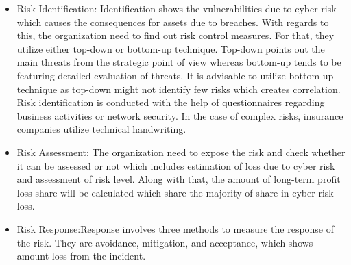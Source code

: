 \documentclass[conference]{IEEEtran}
\begin{document}
\begin{itemize}
    \item Risk Identification: Identification shows the vulnerabilities due to cyber risk which causes the consequences for assets due to breaches. With regards to this, the organization need to find out risk control measures. For that, they utilize either top-down or bottom-up technique. Top-down points out the main threats from the strategic point of view whereas bottom-up tends to be featuring detailed evaluation of threats. It is advisable to utilize bottom-up technique as top-down might not identify few risks which creates correlation. Risk identification  is conducted with the help of questionnaires regarding business activities or network security. In the case of complex risks, insurance companies utilize technical handwriting.  
\item Risk Assessment: The organization need to expose the risk and check whether it can be assessed or not which includes estimation of loss due to cyber risk and assessment of risk level. Along with that, the amount of long-term profit loss share will be calculated which share the majority of share in cyber risk loss. 
\item Risk Response:Response involves three methods to measure the response of the risk. They are avoidance, mitigation, and acceptance, which shows amount loss from the incident.


\end{itemize}
\end{document}
